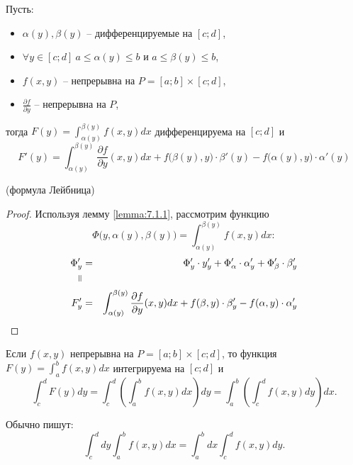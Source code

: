\begin{theorem}\label{theorem:7.1.2}
    Пусть:
    \begin{itemize}
        \item $\alpha(y), \beta(y)$ -- дифференцируемые на $[c;d]$,
        \item $\forall y \in [c;d] \ a\leqslant \alpha(y) \leqslant b$ и $a \leqslant \beta(y) \leqslant b$,
        \item $f(x,y)$ -- непрерывна на $P = [a;b] \times [c;d]$,
        \item $\frac{\partial f}{\partial y}$ -- непрерывна на $P$,
    \end{itemize}
    тогда $F(y) = \int_{\alpha(y)}^{\beta(y)}f(x,y)dx$ дифференцируема на $[c;d]$ и
    \[
        F'(y) = \int_{\alpha(y)}^{\beta(y)}\frac{\partial f}{\partial y}(x,y)dx + f\big(\beta(y),y\big) \cdot \beta'(y) - f\big(\alpha(y),y\big)\cdot \alpha'(y)
    \]
    \begin{center}
        (формула Лейбница)
    \end{center}
\end{theorem}

\begin{proof}
    Используя лемму \ref{lemma:7.1.1}, рассмотрим функцию
    \[
        \Phi\big(y,\alpha(y),\beta(y)\big) = \int_{\alpha(y)}^{\beta(y)}f(x,y)dx:
    \]
    \begin{eqnarray*}
        \Phi_y' & = & \Phi_y' \cdot y_y' + \Phi_\alpha'\cdot\alpha_y' + \Phi_\beta' \cdot \beta_y'                                       \\
        \verteq &   &                                                                                                                    \\
        F_y'    & = & \int_{\alpha(y)}^{\beta(y)}\frac{\partial f}{\partial y}(x,y)dx + f(\beta,y)\cdot \beta_y' - f(\alpha,y)\cdot\alpha_y'
    \end{eqnarray*}
\end{proof}

\begin{theorem}\label{theorem:7.1.3}
    Если $ f(x,y) $ непрерывна на $ P = [a;b] \times [c;d] $, то функция $ F(y) = \int_{a}^{b}f(x,y)dx $ интегрируема на $ [c;d] $ и
    \[
        \int_{c}^{d}F(y)dy = \int_{c}^{d}\left(\int_{a}^{b}f(x,y)dx\right)dy = \int_{a}^{b}\left(\int_{c}^{d}f(x,y)dy\right)dx.
    \]

    Обычно пишут:
    \[
        \int_{c}^{d}dy \int_{a}^{b}f(x,y)dx = \int_{a}^{b}dx \int_{c}^{d}f(x,y)dy.
    \]
\end{theorem}

